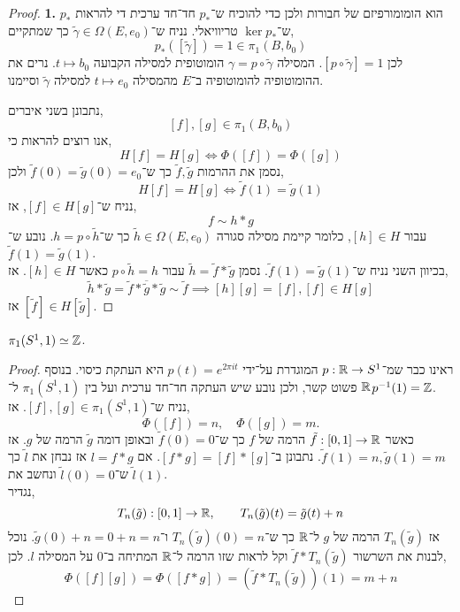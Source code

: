\begin{proof}
	\textbf{1.}
	$p_*$ הוא הומומורפיזם של חבורות ולכן כדי להוכיח ש־$p_*$ חד־חד ערכית די להראות ש־$\ker p_*$ טריוויאלי.
	נניח ש־$\tilde{\gamma} \in \Omega(E, e_0)$ כך שמתקיים,
	\[
		p_*([\tilde{\gamma}])
		= 1 \in \pi_1(B, b_0)
	\]
	לכן $[p \circ \tilde{\gamma}] = 1$.
	המסילה $\gamma = p \circ \tilde{\gamma}$ הומוטופית למסילה הקבועה $t \mapsto b_0$.
	נרים את ההומוטופיה להומוטופיה ב־$E$ מהמסילה $t \mapsto e_0$ למסילה $\tilde{\gamma}$ וסיימנו.

	נתבונן בשני איברים,
	\[
		[f], [g] \in \pi_1(B, b_0)
	\]
	אנו רוצים להראות כי,
	\[
		H[f] = H[g]
		\iff \Phi([f]) = \Phi([g])
	\]
	נסמן את ההרמות $\tilde{f}, \tilde{g}$ כך ש־$\tilde{f}(0) = \tilde{g}(0) = e_0$ ולכן,
	\[
		H[f] = H[g]
		\iff \tilde{f}(1) = \tilde{g}(1)
	\]
	נניח ש־$[f] \in H [g]$, אז,
	\[
		f \sim h * g
	\]
	עבור $[h] \in H$,
	כלומר קיימת מסילה סגורה $\tilde{h} \in \Omega(E, e_0)$ כך ש־$h = p \circ \tilde{h}$.
	נובע ש־$\tilde{f}(1) = \tilde{g}(1)$. \\
	בכיוון השני נניח ש־$\tilde{f}(1) = \tilde{g}(1)$.
	נסמן $\tilde{h} = \tilde{f} * \tilde{g}$ עבור $p \circ \tilde{h} = h$ כאשר $[h] \in H$.
	אז,
	\[
		\tilde{h} * \tilde{g}
		= \tilde{f} * \overline{\tilde{g}} * \tilde{g} \sim \tilde{f}
		\implies [h] [g] = [f],
		[f] \in H [g]
	\]
	אז $[\tilde{f}] \in H[\tilde{g}]$.
\end{proof}
\begin{theorem}
	$\pi_1(S^1, 1) \simeq \mathbb{Z}$.
\end{theorem}
\begin{proof}
	ראינו כבר שמ־$p : \mathbb{R} \to S^1$ המוגדרת על־ידי $p(t) = e^{2 \pi i t}$ היא העתקת כיסוי.
	בנוסף $\mathbb{R}$ פשוט קשר, ולכן נובע שיש העתקה חד־חד ערכית ועל בין $\pi_1(S^1, 1)$ ל־$p^{-1}(1) = \mathbb{Z}$. \\
	נניח ש־$[f], [g] \in \pi_1(S^1, 1)$.
	אז,
	\[
		\Phi([f]) = n,
		\quad
		\Phi([g]) = m
	.\]
	כאשר $\tilde{f} : [0, 1] \to \mathbb{R}$ הרמה של $f$ כך ש־$\tilde{f}(0) = 0$ ובאופן דומה $\tilde{g}$ הרמה של $g$.
	אז $\tilde{f}(1) = n, \tilde{g}(1) = m$.
	נתבונן ב־$[f * g] = [f] * [g]$.
	אם $l = f * g$ אז נבחן את $\tilde{l}$ כך ש־$\tilde{l}(0) = 0$ ונחשב את $\tilde{l}(1)$. \\
	נגדיר,
	\[
		T_n(\tilde{g}) : [0, 1] \to \mathbb{R},
		\qquad
		T_n(\tilde{g})(t) = \tilde{g}(t) + n
	\]
	אז $T_n(\tilde{g})$ הרמה של $g$ ל־$\mathbb{R}$ כך ש־$T_n(\tilde{g})(0) = n$ ו־$\tilde{g}(0) + n = 0 + n = n$.
	נוכל לבנות את השרשור $\tilde{f} * T_n(\tilde{g})$ וקל לראות שזו הרמה ל־$\mathbb{R}$ המתיחה ב־$0$ על המסילה $l$.
	לכן,
	\[
		\Phi([f] [g])
		= \Phi([f * g])
		= (\tilde{f} * T_n(\tilde{g}))(1)
		= m + n
	\]
\end{proof}
